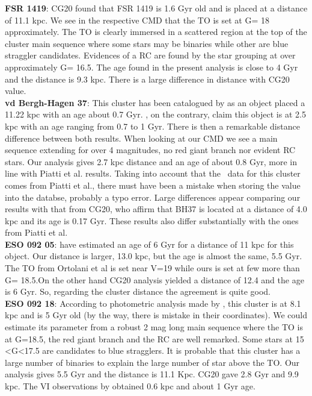 \documentclass[draft]{aa}
\begin{document}
\textbf{FSR 1419}: CG20 found that FSR 1419 is 1.6 Gyr old and is placed at a
distance of 11.1 kpc. We see in the respective CMD that the TO is set at G= 18
approximately. The TO is clearly immersed in a scattered region at the top of
the cluster main sequence where some stars may be binaries while other are
blue straggler candidates. Evidences of a RC are found by the star grouping at
over approximately G= 16.5. The age found in the present analysis is close to 4
Gyr and the distance is 9.3 kpc. There is a large difference in distance
with CG20 value. \\  

\textbf{vd Bergh-Hagen 37}: This cluster has been catalogued by \cite{Dias_2002}
as an object placed a 11.22 kpc with an age about 0.7 Gyr. \cite{Piatti_2010},
on the contrary, claim this object is at 2.5 kpc with an age ranging from 0.7 to
1 Gyr. There is then a remarkable distance difference between both results. When
looking at our CMD we see a main sequence extending for over 4 magnitudes, no red
giant branch nor evident RC stars. Our analysis gives 2.7 kpc distance and 
an age of about 0.8 Gyr, more in line with Piatti et al. results. Taking into account
that the~\cite{Dias_2002} data for this cluster comes from Piatti et al.,
there must have been a mistake when storing the value into the databse, probably a
typo error. Large differences appear comparing our results with that from CG20, who
affirm that BH37 is located at a distance of 4.0 kpc and its age is 0.17 Gyr. These
results also differ substantially with the ones from Piatti et al. \\

\textbf{ESO 092 05}: \cite{Ortolani_2008} have estimated an
age of 6 Gyr for a distance of 11 kpc for this object.  Our distance is
larger, 13.0 kpc, but the age is almost the same, 5.5 Gyr.  The TO from Ortolani et
al is set near V=19 while ours is set  at few more than G= 18.5.On the other
hand CG20 analysis yielded a distance of 12.4 and the age is 6
Gyr. So, regarding the cluster distance the agreement is quite good.\\ 

\textbf{ESO 092 18}: According to photometric analysis made by \cite{Carraro1995},
this cluster is at 8.1 kpc and is 5 Gyr old (by the
way, there is mistake in their coordinates). We could estimate its parameter from a
robust 2 mag long main sequence where the TO is at G=18.5, the red giant branch
and the RC are well remarked. Some stars at 15 <G<17.5 are candidates to blue
stragglers. It is probable that this cluster has a large number of binaries to
explain the large number of star above the TO. Our analysis gives 5.5 Gyr and
the distance is 11.1 Kpc.  CG20 gave 2.8 Gyr and 9.9 kpc. The VI observations by
\cite{Phelps_1994_develop} obtained 0.6 kpc and about 1 Gyr age.\\
\end{document}
